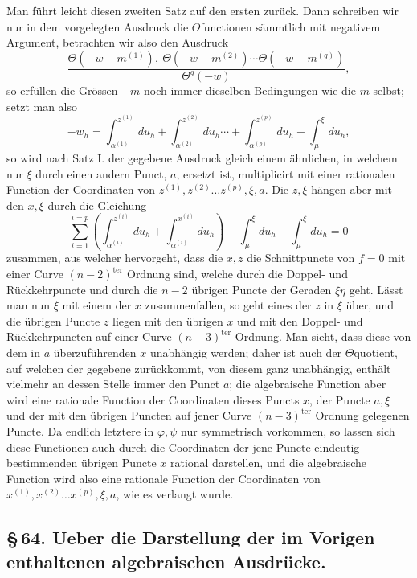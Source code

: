 \documentclass[10pt]{article}
\begin{document}
Man führt leicht diesen zweiten Satz auf den ersten zurück. Dann schreiben wir nur in dem vorgelegten Ausdruck die \(\Theta\)functionen sämmtlich mit negativem Argument, betrachten wir also den Ausdruck
\[
\frac{\Theta(-w-m^{(1)}),\ \Theta(-w-m^{(2)})\cdots\Theta(-w-m^{(q)})}{\Theta^{q}(-w)},
\]
so erfüllen die Grössen \(-m\) noch immer dieselben Bedingungen wie die \(m\) selbst; setzt man also
\[
-w_h=\int_{\alpha^{(1)}}^{z^{(1)}}du_h+
\int_{\alpha^{(2)}}^{z^{(2)}}du_h\cdots+
\int_{\alpha^{(p)}}^{z^{(p)}}du_h-
\int_{\mu}^{\xi}du_h,
\]
so wird nach Satz I. der gegebene Ausdruck gleich einem ähnlichen, in welchem nur \(\xi\) durch einen andern Punct, \(a\), ersetzt ist, multiplicirt mit einer rationalen Function der Coordinaten von \(z^{(1)},z^{(2)}\ldots z^{(p)},\xi,a\). Die \(z,\xi\) hängen aber mit den \(x,\xi\) durch die Gleichung
\[
\sum_{i=1}^{i=p}\left(\int_{\alpha^{(i)}}^{z^{(i)}}du_h+
\int_{\alpha^{(i)}}^{x^{(i)}}du_h\right)-
\int_{\mu}^{\xi}du_h-\int_{\mu}^{\xi}du_h=0
\]
zusammen, aus welcher hervorgeht, dass die \(x,z\) die Schnittpuncte von \(f=0\) mit einer Curve \((n-2)^{\mathrm{ter}}\) Ordnung sind, welche durch die Doppel- und Rückkehrpuncte und durch die \(n-2\) übrigen Puncte der Geraden \(\xi\eta\) geht. Lässt man nun \(\xi\) mit einem der \(x\) zusammenfallen, so geht eines der \(z\) in \(\xi\) über, und die übrigen Puncte \(z\) liegen mit den übrigen \(x\) und mit den Doppel- und Rückkehrpuncten auf einer Curve \((n-3)^{\mathrm{ter}}\) Ordnung. Man sieht, dass diese von dem in \(a\) überzuführenden \(x\) unabhängig werden; daher ist auch der \(\Theta\)quotient, auf welchen der gegebene zurückkommt, von diesem ganz unabhängig, enthält vielmehr an dessen Stelle immer den Punct \(a\); die algebraische Function aber wird eine rationale Function der Coordinaten dieses Puncts \(x\), der Puncte \(a,\xi\) und der mit den übrigen Puncten auf jener Curve \((n-3)^{\mathrm{ter}}\) Ordnung gelegenen Puncte. Da endlich letztere in \(\varphi,\psi\) nur symmetrisch vorkommen, so lassen sich diese Functionen auch durch die Coordinaten der jene Puncte eindeutig bestimmenden übrigen Puncte \(x\) rational darstellen, und die algebraische Function wird also eine rationale Function der Coordinaten von \(x^{(1)},x^{(2)}\ldots x^{(p)},\xi,a\), wie es verlangt wurde.

\clearpage

\subsection*{\S\,64. Ueber die Darstellung der im Vorigen enthaltenen algebraischen Ausdrücke.}
\end{document}
